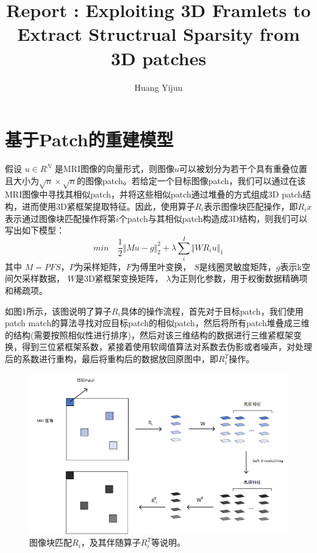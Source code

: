 \documentclass[UTF8]{article}
\begin{document}
	\author{Huang Yijun}
\title{Report : Exploiting 3D Framlets to Extract Structrual Sparsity from 3D patches}
\maketitle

\section{基于Patch的重建模型}
\par 假设 $u\in R^N$ 是MRI图像的向量形式，则图像$u$可以被划分为若干个具有重叠位置且大小为$\sqrt{n} \times \sqrt{n}$的图像patch。若给定一个目标图像patch，我们可以通过在该MRI图像中寻找其相似patch，并将这些相似patch通过堆叠的方式组成3D patch结构，进而使用3D紧框架提取特征。因此，使用算子$R_i$表示图像块匹配操作，即$R_i x$表示通过图像块匹配操作将第$i$个patch与其相似patch构造成3D结构，则我们可以写出如下模型：
\begin{equation}
	min \quad \frac{1}{2}\Vert Mu - g \Vert_2^2 + \lambda \sum_i^I  \Vert WR_iu \Vert_1
\end{equation}
其中 $M = PFS$，$P$为采样矩阵，$F$为傅里叶变换， $S$是线圈灵敏度矩阵，$g$表示k空间欠采样数据， $W$是3D紧框架变换矩阵， $\lambda$为正则化参数，用于权衡数据精确项和稀疏项。
\par 如图1所示，该图说明了算子$R_i$具体的操作流程，首先对于目标patch，我们使用patch match的算法寻找对应目标patch的相似patch，然后将所有patch堆叠成三维的结构(需要按照相似性进行排序)，然后对该三维结构的数据进行三维紧框架变换，得到三位紧框架系数，紧接着使用软阈值算法对系数去伪影或者噪声，对处理后的系数进行重构，最后将重构后的数据放回原图中，即$R_i^T$操作。

\begin{figure}[h]   
	\centering         %
	\includegraphics[scale=0.6]{patch.png}
	\caption{图像块匹配$R_i$，及其伴随算子$R_i^T$等说明。}
\end{figure}
\end{document}
